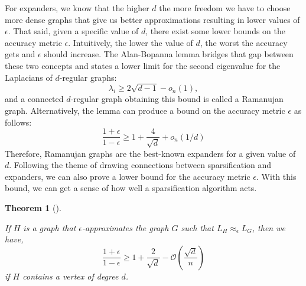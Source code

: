 \documentclass[
  letterpaper,
  DIV=11,
  numbers=noendperiod]{scrartcl}
\theoremstyle{plain}
\theoremstyle{plain}
\theoremstyle{plain}
\theoremstyle{definition}
\theoremstyle{plain}
\newtheorem{theorem}{Theorem}[section]
\theoremstyle{remark}
\begin{document}
For expanders, we know that the higher \(d\) the more freedom we have to
choose more dense graphs that give us better approximations resulting in
lower values of \(\epsilon\). That said, given a specific value of
\(d\), there exist some lower bounds on the accuracy metric
\(\epsilon\). Intuitively, the lower the value of \(d\), the worst the
accuracy gets and \(\epsilon\) should increase. The Alan-Bopanna lemma
bridges that gap between these two concepts and states a lower limit for
the second eigenvalue for the Laplacians of \(d\)-regular graphs: \[
    \lambda_i \geq 2\sqrt{d-1} − o_n(1),
\] and a connected \(d\)-regular graph obtaining this bound is called a
Ramanujan graph. Alternatively, the lemma can produce a bound on the
accuracy metric \(\epsilon\) as follows:
\[\frac{1 + \epsilon}{1 - \epsilon} \ge 1 + \frac{4}{\sqrt{d}} + o_n(1/d)\]
Therefore, Ramanujan graphs are the best-known expanders for a given
value of \(d\). Following the theme of drawing connections between
sparsification and expanders, we can also prove a lower bound for the
accuracy metric \(\epsilon\). With this bound, we can get a sense of how
well a sparsification algorithm acts.

\leavevmode{}%
\begin{theorem}[]\label{thm-ramanujan-sparsifier-bounds}

If \(H\) is a graph that \(\epsilon\)-approximates the graph \(G\) such
that \(L_H \approx_\epsilon L_G\), then we have,
\[\frac{1 + \epsilon}{1 - \epsilon} \ge 1 + \frac{2}{\sqrt{d}} - \mathcal{O}\left( \frac{\sqrt{d}}{n} \right)\]
if \(H\) contains a vertex of degree \(d\).

\end{theorem}
\end{document}
